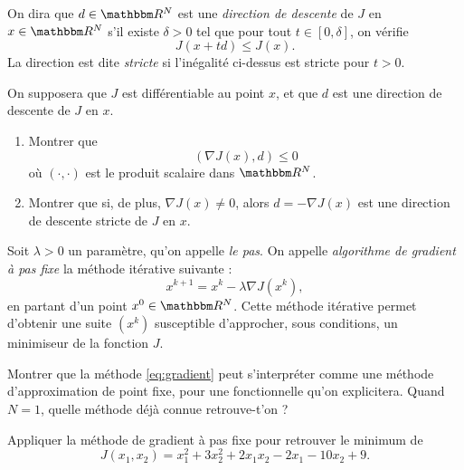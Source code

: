 \medskip

On dira que $d \in \eR^N$ est une \emph{direction de descente} de $J$ en $x\in \eR^N$ s'il existe $\delta > 0$ tel que pour tout $t \in [0,\delta]$, on vérifie
\[
J ( x + t d ) \leq J(x).
\]
La direction est dite \emph{stricte} si l'inégalité ci-dessus est stricte pour $t>0$.

\medskip

\begin{exercice}

On supposera que $J$ est différentiable au point $x$, et que $d$ est une direction de descente de $J$ en $x$.

\begin{enumerate}

\item Montrer que \[ ( \nabla J (x) , d ) \leq 0 \]
où $(\cdot,\cdot)$ est le produit scalaire dans $\eR^N$.

\item Montrer que si, de plus, $\nabla J (x) \neq 0$, alors $d = -\nabla J(x)$ est une direction de descente stricte de $J$ en $x$.

\end{enumerate}

\end{exercice}

\medskip

Soit $\lambda > 0$ un paramètre, qu'on appelle \emph{le pas}. On appelle \emph{algorithme de gradient à pas fixe} la méthode itérative suivante :
\begin{equation}\label{eq:gradient}
x^{k+1} = x^k - \lambda \nabla J (x^k),
\end{equation}
en partant d'un point $x^0 \in \eR^N$. Cette méthode itérative permet d'obtenir une suite $(x^k)$ susceptible d'approcher, sous conditions, un minimiseur de la fonction $J$.

\medskip

\begin{exercice}

Montrer que la méthode \eqref{eq:gradient} peut s'interpréter comme une méthode d'approximation de point fixe, pour une fonctionnelle qu'on explicitera. Quand $N=1$, quelle méthode déjà connue retrouve-t'on ?

\end{exercice}

\medskip

\begin{exercice}

Appliquer la méthode de gradient à pas fixe pour retrouver le minimum de 
\[
J(x_1,x_2)=x_1^2+3x_2^2+2x_1x_2-2x_1-10x_2+9.
\]
\end{exercice}


